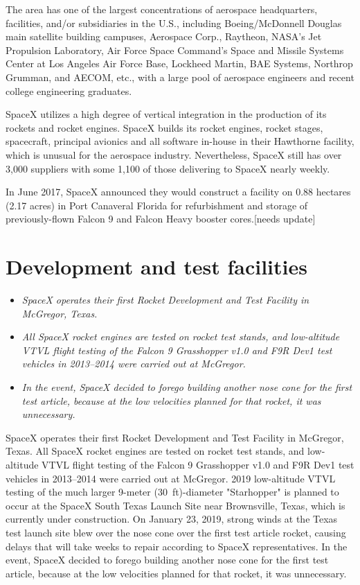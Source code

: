 The area has one of the largest concentrations of aerospace
headquarters, facilities, and/or subsidiaries in the U.S., including
Boeing/McDonnell Douglas main satellite building campuses, Aerospace
Corp., Raytheon, NASA's Jet Propulsion Laboratory, Air Force Space
Command's Space and Missile Systems Center at Los Angeles Air Force
Base, Lockheed Martin, BAE Systems, Northrop Grumman, and AECOM, etc.,
with a large pool of aerospace engineers and recent college engineering
graduates.

SpaceX utilizes a high degree of vertical integration in the production
of its rockets and rocket engines. SpaceX builds its rocket engines,
rocket stages, spacecraft, principal avionics and all software in-house
in their Hawthorne facility, which is unusual for the aerospace
industry. Nevertheless, SpaceX still has over 3,000 suppliers with some
1,100 of those delivering to SpaceX nearly weekly.

In June 2017, SpaceX announced they would construct a facility on 0.88
hectares (2.17 acres) in Port Canaveral Florida for refurbishment and
storage of previously-flown Falcon 9 and Falcon Heavy booster
cores.{[}needs update{]}

\section{Development and test
facilities}\label{development-and-test-facilities}

\begin{itemize}
\item
  \emph{SpaceX operates their first Rocket Development and Test Facility
  in McGregor, Texas.}
\item
  \emph{All SpaceX rocket engines are tested on rocket test stands, and
  low-altitude VTVL flight testing of the Falcon 9 Grasshopper v1.0 and
  F9R Dev1 test vehicles in 2013--2014 were carried out at McGregor.}
\item
  \emph{In the event, SpaceX decided to forego building another nose
  cone for the first test article, because at the low velocities planned
  for that rocket, it was unnecessary.}
\end{itemize}

SpaceX operates their first Rocket Development and Test Facility in
McGregor, Texas. All SpaceX rocket engines are tested on rocket test
stands, and low-altitude VTVL flight testing of the Falcon 9 Grasshopper
v1.0 and F9R Dev1 test vehicles in 2013--2014 were carried out at
McGregor. 2019 low-altitude VTVL testing of the much larger 9-meter
(30~ft)-diameter "Starhopper" is planned to occur at the SpaceX South
Texas Launch Site near Brownsville, Texas, which is currently under
construction. On January 23, 2019, strong winds at the Texas test launch
site blew over the nose cone over the first test article rocket, causing
delays that will take weeks to repair according to SpaceX
representatives. In the event, SpaceX decided to forego building another
nose cone for the first test article, because at the low velocities
planned for that rocket, it was unnecessary.

